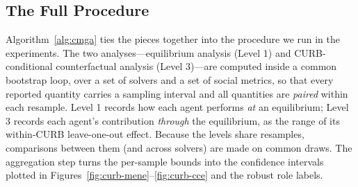 \documentclass[sigconf,anonymous]{aamas}
\begin{document}
\subsection{The Full Procedure}
\label{sec:algorithm}

Algorithm~\ref{alg:cmga} ties the pieces together into the procedure we run in the experiments. The two analyses---equilibrium analysis (Level 1) and CURB-conditional counterfactual analysis (Level 3)---are computed inside a common bootstrap loop, over a set of solvers and a set of social metrics, so that every reported quantity carries a sampling interval and all quantities are \emph{paired} within each resample. Level 1 records how each agent performs \emph{at} an equilibrium; Level 3 records each agent's contribution \emph{through} the equilibrium, as the range of its within-CURB leave-one-out effect. Because the levels share resamples, comparisons between them (and across solvers) are made on common draws. The aggregation step turns the per-sample bounds into the confidence intervals plotted in Figures~\ref{fig:curb-mene}--\ref{fig:curb-cce} and the robust role labels.
\end{document}
